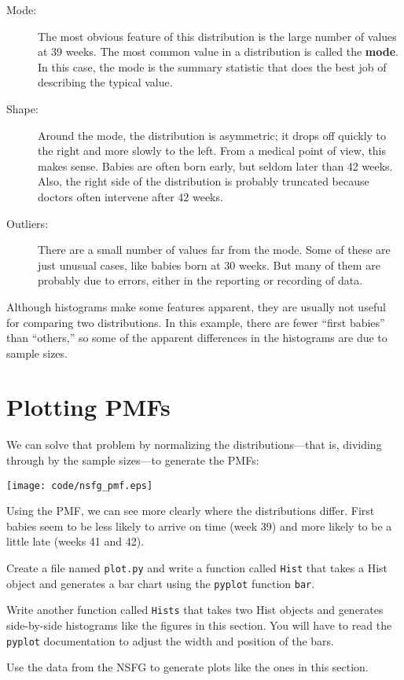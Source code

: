 \documentclass[10pt]{book}
\begin{document}
\begin{description}

\item[Mode:]  The most obvious feature of this distribution is the large
number of values at 39 weeks.  The most common value in a distribution is
called the {\bf mode}.  In this case, the mode is the summary statistic
that does the best job of describing the typical value.

\item[Shape:] Around the mode, the distribution is asymmetric; it drops
off quickly to the right and more slowly to the left.  From a medical
point of view, this makes sense.  Babies are often born early, but
seldom later than 42 weeks.  Also, the right side of the distribution is
probably truncated because doctors often intervene after 42 weeks.

\item[Outliers:] There are a small number of values far from the mode.
Some of these are just unusual cases, like babies born at 30 weeks.
But many of them are probably due to errors, either in the reporting
or recording of data.

\end{description}

Although histograms make some features apparent, they are usually not
useful for comparing two distributions.  In this example, there are
fewer ``first babies'' than ``others,'' so some of the apparent
differences in the histograms are due to sample sizes.

\section{Plotting PMFs}

We can solve that problem by normalizing the distributions---that
is, dividing through by the sample sizes---to generate the PMFs:

\beforefig
\centerline{\texttt{[image: code/nsfg\_pmf.eps]}}
\afterfig

Using the PMF, we can see more clearly where the distributions
differ.  First babies seem to be less likely to arrive on time
(week 39) and more likely to be a little late (weeks 41 and 42).

\begin{ex}
Create a file named {\tt plot.py} and write a function called
{\tt Hist} that takes a Hist object and generates a bar chart
using the {\tt pyplot} function {\tt bar}.

Write another function called {\tt Hists} that takes two Hist objects
and generates side-by-side histograms like the figures in this section.
You will have to read the {\tt pyplot} documentation to adjust the
width and position of the bars.

Use the data from the NSFG to generate plots like the ones in this
section.
\end{ex}
\end{document}
